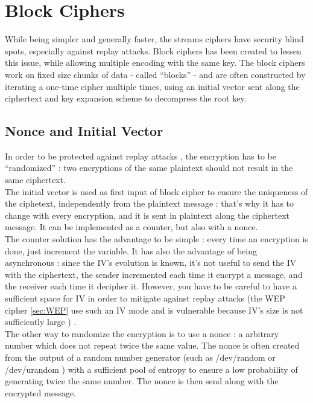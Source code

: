 \section{ Block Ciphers }

While being simpler and generally faster, the streams ciphers have security blind spots, especially against replay attacks. Block ciphers has been created to lessen this issue, while allowing multiple encoding with the same key. The block ciphers work on fixed size chunks of data - called ``blocks'' - and are often constructed by iterating a one-time cipher multiple times, using an initial vector sent along the ciphertext and key expansion scheme to decompress the root key.


\subsection{Nonce and Initial Vector}
\label{sec:randomization}

In order to be protected against replay attacks , the encryption has to be ``randomized'' : two encryptions of the same plaintext should not result in the same ciphertext. \\
The initial vector is used as first input of block cipher to ensure the uniqueness of the ciphetext, independently from the plaintext message : that's why it has to change with every encryption, and it is sent in plaintext along the ciphertext message. It can be implemented as a counter, but also with  a nonce.\\
The counter solution has the advantage to be simple : every time an encryption is done, just increment the variable. It has also the advantage of being asynchronous : since the IV's evolution is known, it's not useful to send the IV with the ciphertext, the sender incremented each time it encrypt a message, and the receiver each time it decipher it. However, you have to be careful to have a sufficient space for IV in order to mitigate against replay attacks (the WEP cipher \ref{sec:WEP} use such an IV mode and is vulnerable because IV's size is not sufficiently large )  . \\
The other way to randomize the encryption is to use a nonce : a arbitrary number which does not repeat twice the same value. The nonce is often created from the output of a random number generator (such as /dev/random or /dev/urandom ) with a sufficient pool of entropy to ensure a low probability of generating twice the same number. The nonce is then send along with the encrypted message. 

